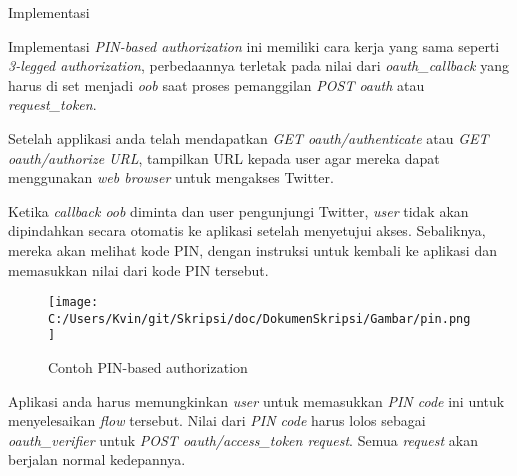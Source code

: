 Implementasi

Implementasi \textit{PIN-based authorization} ini memiliki cara kerja yang sama seperti \textit{3-legged authorization}, perbedaannya terletak pada nilai dari \textit{oauth\_callback} yang harus di set menjadi \textit{oob} saat proses pemanggilan \textit{POST oauth} atau \textit{request\_token}.

Setelah applikasi anda telah mendapatkan \textit{GET oauth/authenticate} atau \textit{GET oauth/authorize URL}, tampilkan URL kepada user agar mereka dapat menggunakan \textit{web browser} untuk mengakses Twitter.

Ketika \textit{callback oob} diminta dan user pengunjungi Twitter, \textit{user} tidak akan dipindahkan secara otomatis ke aplikasi setelah menyetujui akses. Sebaliknya, mereka akan melihat kode PIN, dengan instruksi untuk kembali ke aplikasi dan memasukkan nilai dari kode PIN tersebut.

\begin{figure}[htbp]
	\centering
		\texttt{[image: C:/Users/Kvin/git/Skripsi/doc/DokumenSkripsi/Gambar/pin.png]}
	\caption{Contoh PIN-based authorization}
	\label{fig:pin}
\end{figure}

Aplikasi anda harus memungkinkan \textit{user} untuk memasukkan \textit{PIN code} ini untuk menyelesaikan \textit{flow} tersebut. Nilai dari \textit{PIN code} harus lolos sebagai \textit{oauth\_verifier} untuk \textit{POST oauth/access\_token request}. Semua \textit{request} akan berjalan normal kedepannya.




